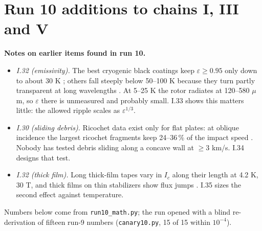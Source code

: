 \section*{Run 10 additions to chains I, III and V}
\noindent\textbf{Notes on earlier items found in run 10.}
\begin{itemize}
\item \emph{I.32 (emissivity).} The best cryogenic black coatings keep $\varepsilon\ge0.95$ only down to about 30 K \cite{birb}; others fall
steeply below 50--100 K because they turn partly transparent at long wavelengths \cite{acktar}. At 5--25 K the rotor radiates at
120--580 $\mu$m, so $\varepsilon$ there is unmeasured and probably small. I.33 shows this matters little: the allowed ripple scales as $\varepsilon^{1/3}$.
\item \emph{I.30 (sliding debris).} Ricochet data exist only for flat plates: at oblique incidence the largest ricochet fragments keep 24--36\,\% of
the impact speed \cite{schonberg}. Nobody has tested debris sliding along a concave wall at $\ge3$ km/s. I.34 designs that test.
\item \emph{I.32 (thick film).} Long thick-film tapes vary in $I_c$ along their length at 4.2 K, 30 T, and thick films on thin stabilizers show
flux jumps \cite{jaroszynski25}. I.35 sizes the second effect against temperature.
\end{itemize}
Numbers below come from \texttt{run10\_math.py}; the run opened with a blind re-derivation of fifteen run-9 numbers (\texttt{canary10.py}, 15 of 15
within $10^{-4}$).

\setcounter{section}{1}\setcounter{subsection}{32}
